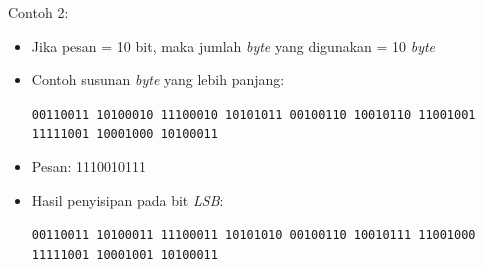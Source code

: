 \documentclass{article}
\begin{document}

Contoh 2:

\begin{itemize}
    \item Jika pesan = 10 bit, maka jumlah \textit{byte} yang digunakan = 10 \textit{byte}
    \item Contoh susunan \textit{byte} yang lebih panjang:
    \begin{center}
    \texttt{00110011 10100010 11100010 10101011 00100110}\
    \texttt{10010110 11001001 11111001 10001000 10100011}
    \end{center}
    \item Pesan: 1110010111
    \item Hasil penyisipan pada bit \textit{LSB}:
    \begin{center}
    \texttt{00110011 10100011 11100011 10101010 00100110}\
    \texttt{10010111 11001000 11111001 10001001 10100011}
    \end{center}
\end{itemize}
\end{document}
